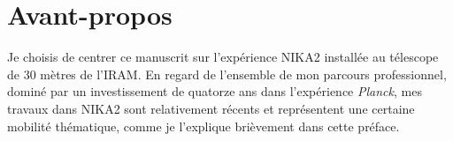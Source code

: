 \documentclass[a4paper, 11pt]{report}
\begin{document}




%
\newpage
\tableofcontents
\newpage


% 
%

\chapter*{Avant-propos}

Je choisis de centrer ce manuscrit sur l'expérience NIKA2 installée au
télescope de 30 mètres de l'IRAM. En regard de l'ensemble de mon parcours
professionnel, dominé par un investissement de quatorze ans dans
l'expérience \emph{Planck}, mes travaux dans NIKA2 sont relativement récents
et représentent une certaine mobilité thématique, comme je l'explique
brièvement dans cette préface. 
\end{document}
